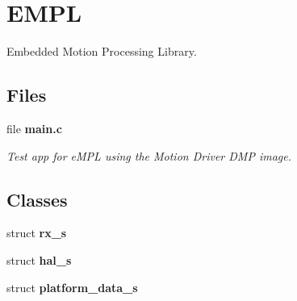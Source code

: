 \section{E\+M\+PL}
\label{group__e_m_p_l}


Embedded Motion Processing Library.  


\subsection*{Files}
\begin{DoxyCompactItemize}
\item 
file \textbf{ main.\+c}
\begin{DoxyCompactList}\small\item\em Test app for e\+M\+PL using the Motion Driver D\+MP image. \end{DoxyCompactList}\end{DoxyCompactItemize}
\subsection*{Classes}
\begin{DoxyCompactItemize}
\item 
struct \textbf{ rx\+\_\+s}
\item 
struct \textbf{ hal\+\_\+s}
\item 
struct \textbf{ platform\+\_\+data\+\_\+s}
\end{DoxyCompactItemize}
